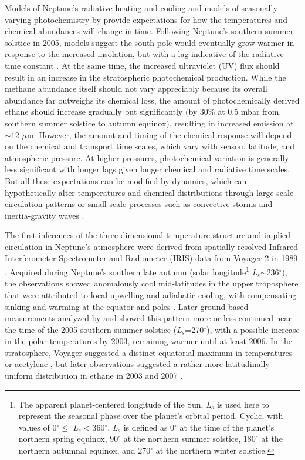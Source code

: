 \documentclass[twocolumn,10pt]{aastex631}
\begin{document}
Models of Neptune's radiative heating and cooling \citep{greathouse2011spatially} and models of seasonally varying photochemistry by \citet{moses2018seasonal} provide expectations for how the temperatures and chemical abundances will change in time.  Following Neptune’s southern summer solstice in 2005, models suggest the south pole would eventually grow warmer in response to the increased insolation, but with a lag indicative of the radiative time constant \citep{greathouse2011spatially}.  At the same time, the increased ultraviolet (UV) flux should result in an increase in the stratospheric photochemical production.  While the methane abundance itself should not vary appreciably because its overall abundance far outweighs its chemical loss, the amount of photochemically derived ethane should increase gradually but significantly (by 30\% at 0.5 mbar from southern summer solstice to autumn equinox), resulting in increased emission at $\sim12$ $\mu$m. However, the amount and timing of the chemical response will depend on the chemical and transport time scales, which vary with season, latitude, and atmospheric pressure.  At higher pressures, photochemical variation is generally less significant with longer lags given longer chemical and radiative time scales.  But all these expectations can be modified by dynamics, which can hypothetically alter temperatures and chemical distributions through large-scale circulation patterns or small-scale processes such as convective storms and inertia-gravity waves \citep{conrath1989neptune,fletcher2014neptune,dePater2014neptune}. 

The first inferences of the three-dimensional temperature structure and implied circulation in Neptune's atmosphere were derived from spatially resolved Infrared Interferometer Spectrometer and Radiometer (IRIS) data from Voyager 2 in 1989 \citep{smith1989voyager,conrath1989neptune}. Acquired during Neptune's southern late autumn (solar longitude\footnote{The apparent planet-centered longitude of the Sun, \textit{L$_s$} is used here to represent the seasonal phase over the planet's orbital period.  Cyclic, with values of 0$^{\circ}\leq$ \textit{L$_s$}$<$360$^{\circ}$, \textit{L$_s$} is defined as 0$^{\circ}$ at the time of the planet's northern spring equinox, 90$^{\circ}$ at the northern summer solstice, 180$^{\circ}$ at the northern autumnal equinox, and 270$^{\circ}$ at the northern winter solstice.} \textit{L$_s$}$\sim$236$^{\circ}$), the observations showed anomalously cool mid-latitudes in the upper troposphere that were attributed to local upwelling and adiabatic cooling, with compensating sinking and warming at the equator and poles \citep{conrath1990temperature}.  Later ground based measurements analyzed by \citet{fletcher2014neptune} and \citet{dePater2014neptune} showed this pattern more or less continued near the time of the 2005 southern summer solstice (\textit{L$_s$}=270$^{\circ}$), with a possible increase in the polar temperatures by 2003, remaining warmer until at least 2006. In the stratosphere, Voyager suggested a distinct equatorial maximum in temperatures or acetylene \citep{bezard1991hydrocarbons}, but later observations suggested a rather more latitudinally uniform distribution in ethane in 2003 and 2007 \citep{greathouse2011spatially,fletcher2014neptune}. 
\end{document}
